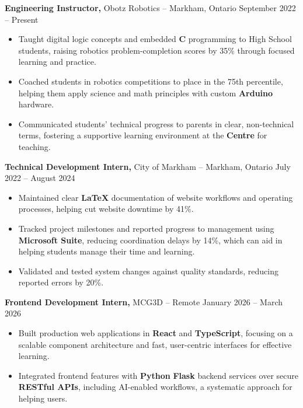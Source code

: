\documentclass[11pt]{article}
\begin{document}
\smallskip
\textbf{Engineering Instructor,} {Obotz Robotics} -- Markham, Ontario \hfill September 2022 -- Present \\
\begin{itemize}
  \item Taught digital logic concepts and embedded \textbf{C} programming to High School students, raising robotics problem-completion scores by 35\% through focused learning and practice.
  \item Coached students in robotics competitions to place in the 75th percentile, helping them apply science and math principles with custom \textbf{Arduino} hardware.
  \item Communicated students' technical progress to parents in clear, non-technical terms, fostering a supportive learning environment at the \textbf{Centre} for teaching.
\end{itemize}

\smallskip
\textbf{Technical Development Intern,} {City of Markham} -- Markham, Ontario \hfill July 2022 -- August 2024 \\
\begin{itemize}
  \item Maintained clear \textbf{LaTeX} documentation of website workflows and operating processes, helping cut website downtime by 41\%.
  \item Tracked project milestones and reported progress to management using \textbf{Microsoft Suite}, reducing coordination delays by 14\%, which can aid in helping students manage their time and learning.
  \item Validated and tested system changes against quality standards, reducing reported errors by 20\%.
\end{itemize}

\smallskip
\textbf{Frontend Development Intern,} {MCG3D} -- Remote \hfill January 2026 -- March 2026 \\
\begin{itemize}
  \item Built production web applications in \textbf{React} and \textbf{TypeScript}, focusing on a scalable component architecture and fast, user-centric interfaces for effective learning.
  \item Integrated frontend features with \textbf{Python} \textbf{Flask} backend services over secure \textbf{RESTful APIs}, including AI-enabled workflows, a systematic approach for helping users.
\end{itemize}
\end{document}
